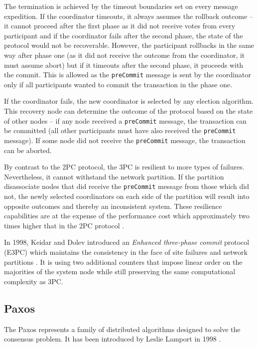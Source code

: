 \documentclass[oneside,
  digital, %
  table,   %
  lof,     %
  lot,     %
]{fithesis3}
\begin{document}
The termination is achieved by the timeout boundaries set on every message expedition. If the coordinator timeouts, it always assumes the rollback outcome -- it cannot proceed after the first phase as it did not receive votes from every participant and if the coordinator fails after the second phase, the state of the protocol would not be recoverable. However, the participant rollbacks in the same way after phase one (as it did not receive the outcome from the coordinator, it must assume abort) but if it timeouts after the second phase, it proceeds with the commit. This is allowed as the \texttt{preCommit} message is sent by the coordinator only if all participants wanted to commit the transaction in the phase one.

If the coordinator fails, the new coordinator is selected by any election algorithm. This recovery node can determine the outcome of the protocol based on the state of other nodes -- if any node received a \texttt{preCommit} message, the transaction can be committed (all other participants must have also received the \texttt{preCommit} message). If some node did not receive the \texttt{preCommit} message, the transaction can be aborted.

By contrast to the 2PC protocol, the 3PC is resilient to more types of failures. Nevertheless, it cannot withstand the network partition. If the partition disassociate nodes that did receive the \texttt{preCommit} message from those which did not, the newly selected coordinators on each side of the partition will result into opposite outcomes and thereby an inconsistent system. These resilience capabilities are at the expense of the performance cost which approximately two times higher that in the 2PC protocol \cite{3PC}.

In 1998, Keidar and Dolev introduced an \textit{Enhanced three-phase commit} protocol (E3PC) which maintains the consistency in the face of site failures and network partitions \cite{E3PC}. It is using two additional counters that impose linear order on the majorities of the system node while still preserving the same computational complexity as 3PC. 


\subsection{Paxos}

The Paxos represents a family of distributed algorithms designed to solve the consensus problem. It has been introduced by Leslie Lamport in 1998 \cite{Paxos}.
\end{document}
